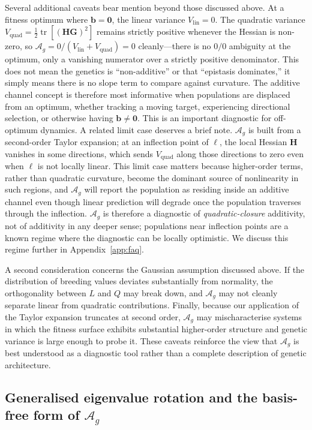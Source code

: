 \documentclass[9pt,twocolumn,twoside,lineno]{gsajnl}
\newcommand{\vect}[1]{\boldsymbol{#1}}
\newcommand{\mat}[1]{\mathbf{#1}}
\newcommand{\tr}{\ensuremath{\operatorname{tr}}\xspace}
\newcommand{\Ag}{\ensuremath{\mathcal{A}_{g}}\xspace}
\newcommand{\Vlin}{\ensuremath{V_{\text{lin}}}\xspace}
\newcommand{\Vquad}{\ensuremath{V_{\text{quad}}}\xspace}
\begin{document}
Several additional caveats bear mention beyond those discussed above. At a fitness optimum where $\vect{b} = \vect{0}$, the linear variance $\Vlin = 0$. The quadratic variance $\Vquad = \tfrac{1}{2}\tr[(\mat{H}\mat{G})^2]$ remains strictly positive whenever the Hessian is non-zero, so $\Ag = 0/(\Vlin + \Vquad) = 0$ cleanly---there is no $0/0$ ambiguity at the optimum, only a vanishing numerator over a strictly positive denominator. This does not mean the genetics is ``non-additive'' or that ``epistasis dominates,'' it simply means there is no slope term to compare against curvature. The additive channel concept is therefore most informative when populations are displaced from an optimum, whether tracking a moving target, experiencing directional selection, or otherwise having $\vect{b} \neq \vect{0}$. This is an important diagnostic for off-optimum dynamics. A related limit case deserves a brief note. \Ag is built from a second-order Taylor expansion; at an inflection point of $\ell$, the local Hessian $\mat{H}$ vanishes in some directions, which sends $\Vquad$ along those directions to zero even when $\ell$ is not locally linear. This limit case matters because higher-order terms, rather than quadratic curvature, become the dominant source of nonlinearity in such regions, and \Ag will report the population as residing inside an additive channel even though linear prediction will degrade once the population traverses through the inflection. \Ag is therefore a diagnostic of \emph{quadratic-closure} additivity, not of additivity in any deeper sense; populations near inflection points are a known regime where the diagnostic can be locally optimistic. We discuss this regime further in Appendix~\ref{app:faq}. 

A second consideration concerns the Gaussian assumption discussed above. If the distribution of breeding values deviates substantially from normality, the orthogonality between $L$ and $Q$ may break down, and \Ag may not cleanly separate linear from quadratic contributions. Finally, because our application of the Taylor expansion truncates at second order, \Ag may mischaracterise systems in which the fitness surface exhibits substantial higher-order structure and genetic variance is large enough to probe it. These caveats reinforce the view that \Ag is best understood as a diagnostic tool rather than a complete description of genetic architecture.

\subsection{Generalised eigenvalue rotation and the basis-free form of \Ag}
\label{sec:rotation}
\end{document}
